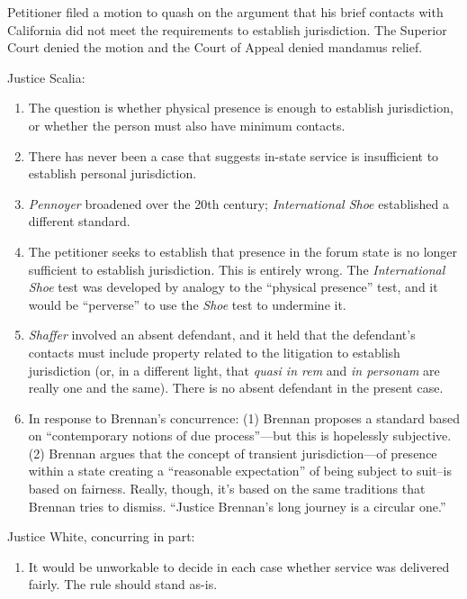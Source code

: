 Petitioner filed a motion to quash on the argument that his brief
contacts with California did not meet the requirements to establish
jurisdiction. The Superior Court denied the motion and the Court of
Appeal denied mandamus relief.

Justice Scalia:

\begin{enumerate}
\item
  The question is whether physical presence is enough to establish
  jurisdiction, or whether the person must also have minimum contacts.
\item
  There has never been a case that suggests in-state service is
  insufficient to establish personal jurisdiction.
\item
  \emph{Pennoyer} broadened over the 20th century; \emph{International
  Shoe} established a different standard.
\item
  The petitioner seeks to establish that presence in the forum state is
  no longer sufficient to establish jurisdiction. This is entirely
  wrong. The \emph{International Shoe} test was developed by analogy to
  the ``physical presence'' test, and it would be ``perverse'' to use
  the \emph{Shoe} test to undermine it.
\item
  \emph{Shaffer} involved an absent defendant, and it held that the
  defendant's contacts must include property related to the litigation
  to establish jurisdiction (or, in a different light, that \emph{quasi
  in rem} and \emph{in personam} are really one and the same). There is
  no absent defendant in the present case.
\item
  In response to Brennan's concurrence: (1) Brennan proposes a standard
  based on ``contemporary notions of due process''---but this is
  hopelessly subjective. (2) Brennan argues that the concept of
  transient jurisdiction---of presence within a state creating a
  ``reasonable expectation'' of being subject to suit--is based on
  fairness. Really, though, it's based on the same traditions that
  Brennan tries to dismiss. ``Justice Brennan's long journey is a
  circular one.''
\end{enumerate}

Justice White, concurring in part:

\begin{enumerate}
\item
  It would be unworkable to decide in each case whether service was
  delivered fairly. The rule should stand as-is.
\end{enumerate}

